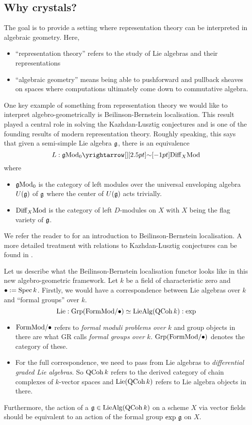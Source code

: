 \documentclass[./main.tex]{subfiles}
\begin{document}
\subsection{Why crystals?}

The goal is to provide a setting where 
representation theory can be interpreted in algebraic geometry.
Here, 
\begin{itemize}
  \item ``representation theory'' refers to the study of Lie algebras
  and their representations
  \item ``algebraic geometry'' means being able to pushforward and pullback 
  sheaves on spaces where 
  computations ultimately come down to commutative algebra.
\end{itemize}

One key example of something from representation theory we would like to 
interpret algebro-geometrically is Beilinson-Bernstein localisation.
This result played a central role in solving the Kazhdan-Lusztig conjectures
and is one of the founding results of modern representation theory.
Roughly speaking, 
this says that given a semi-simple Lie algebra $\mathfrak{g}$,
there is an equivalence \[
  L : \f{g}\MOD_0 \map{\sim}{} \DIFF_X\MOD
\]
where \begin{itemize}
  \item $\mathfrak{g}\mathrm{Mod}_0$ is the category of left modules over 
  the universal enveloping algebra $U(\mathfrak{g})$ of $\mathfrak{g}$ where
  the center of $U(\mathfrak{g})$ acts trivially.
  \item $\mathrm{Diff}_X\mathrm{Mod}$ is the category of left $D$-modules on $X$ with
  $X$ being the flag variety of $\mathfrak{g}$.
\end{itemize}
We refer the reader to \cite*{Keller} for an introduction to 
Beilinson-Bernstein localisation.
A more detailed treatment with relations to Kazhdan-Lusztig conjectures
can be found in \cite[Ch 11, Ch 12]{H.T.T.}.

Let us describe what the Beilinson-Bernstein localisation functor looks like
in this new algebro-geometric framework.
Let $k$ be a field of characteristic zero
and $\bullet := \mathrm{Spec}\,k$.
Firstly, we would have a correspondence between
Lie algebras over $k$ and ``formal groups'' over $k$.
\cite[Ch 7, 3.1.4]{GR2}
\[
  \mathrm{Lie} : \mathrm{Grp}(\mathrm{FormMod} / \bullet) \simeq \mathrm{Lie}\mathrm{Alg}(\mathrm{QCoh}\,k) : \exp
\]
\begin{itemize}
  \item $\mathrm{FormMod} / \bullet$ refers to \emph{formal moduli problems over $k$}
  \cite[Ch 2]{Lurie-DAGX}\cite[Ch 5, 1.1.]{GR2} and 
  group objects in there are what GR calls
  \emph{formal groups over $k$}.
  $\mathrm{Grp}(\mathrm{FormMod} / \bullet)$ denotes the category of these.
  \item For the full correspondence, we need to pass from Lie algebras to
  \emph{differential graded Lie algebras}.
  So $\mathrm{QCoh}\,k$ refers to the derived category of chain complexes of
  $k$-vector spaces and $\mathrm{Lie}(\mathrm{QCoh}\,k)$ refers to
  Lie algebra objects in there.
  \cite[2.1.5]{Lurie-DAGX}
\end{itemize}
Furthermore, the action of a $\mathfrak{g} \in \mathrm{Lie}\mathrm{Alg}(\mathrm{QCoh}\,k)$
on a scheme $X$ via vector fields should be equivalent to
an action of the formal group $\exp\,\mathfrak{g}$ on $X$.
\end{document}
